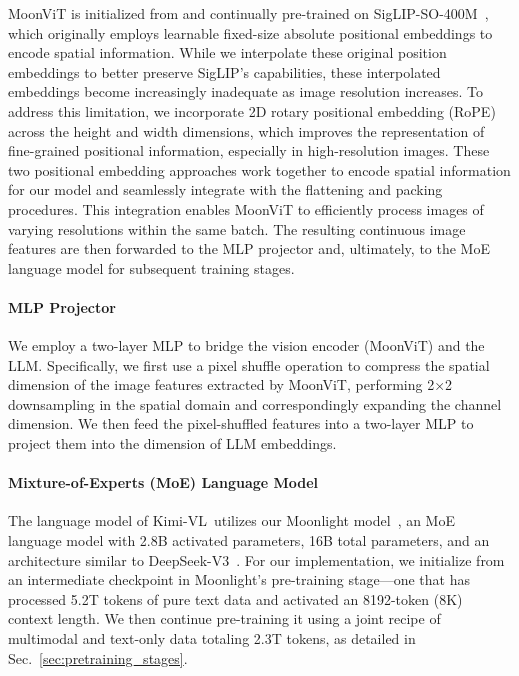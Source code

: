 \documentclass{article}
\newcommand{\ourname}{{Kimi-VL}}
\newcommand{\citep}[1]{\parencite{#1}}
\begin{document}
MoonViT is initialized from and continually pre-trained on SigLIP-SO-400M~\citep{zhai2023sigmoidlosslanguageimage}, which originally employs learnable fixed-size absolute positional embeddings to encode spatial information. While we interpolate these original position embeddings to better preserve SigLIP's capabilities, these interpolated embeddings become increasingly inadequate as image resolution increases. To address this limitation, we incorporate 2D rotary positional embedding (RoPE)~\citep{su2023roformerenhancedtransformerrotary} across the height and width dimensions, which improves the representation of fine-grained positional information, especially in high-resolution images. These two positional embedding approaches work together to encode spatial information for our model and seamlessly integrate with the flattening and packing procedures. This integration enables MoonViT to efficiently process images of varying resolutions within the same batch. The resulting continuous image features are then forwarded to the MLP projector and, ultimately, to the MoE language model for subsequent training stages.


\paragraph{MLP Projector}
We employ a two-layer MLP to bridge the vision encoder (MoonViT) and the LLM. Specifically, we first use a pixel shuffle operation to compress the spatial dimension of the image features extracted by MoonViT, performing 2×2 downsampling in the spatial domain and correspondingly expanding the channel dimension. We then feed the pixel-shuffled features into a two-layer MLP to project them into the dimension of LLM embeddings.


\paragraph{Mixture-of-Experts (MoE) Language Model} The language model of \ourname~utilizes our Moonlight model~\citep{liu2025muonscalablellmtraining}, an MoE language model with 2.8B activated parameters, 16B total parameters, and an architecture similar to DeepSeek-V3~\citep{deepseekai2025deepseekv3technicalreport}. For our implementation, we initialize from an intermediate checkpoint in Moonlight's pre-training stage—one that has processed 5.2T tokens of pure text data and activated an 8192-token (8K) context length. We then continue pre-training it using a joint recipe of multimodal and text-only data totaling 2.3T tokens, as detailed in Sec.~\ref{sec:pretraining_stages}.
\end{document}
